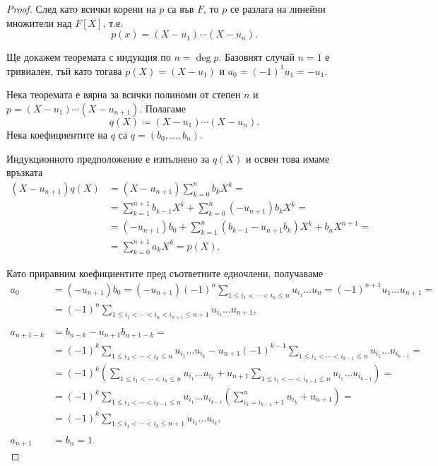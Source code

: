 \documentclass[
  headings=standardclasses,
  bibliography=totocnumbered,
]{scrartcl}
\begin{document}
\begin{proof}
  След като всички корени на \( p \) са във \( F \), то \( p \) се разлага на линейни множители над \( F[X] \), т.е.
  \begin{equation*}
    p(x) = (X - u_1) \cdots (X - u_n).
  \end{equation*}

  Ще докажем теоремата с индукция по \( n = \deg p \). Базовият случай \( n = 1 \) е тривиален, тъй като тогава \( p(X) = (X - u_1) \) и \( a_0 = {(-1)}^1 u_1 = -u_1 \).

  Нека теоремата е вярна за всички полиноми от степен \( n \) и \( p = (X - u_1) \cdots (X - u_{n+1}) \). Полагаме
  \begin{equation*}
    q(X) \coloneqq (X - u_1) \cdots (X - u_n).
  \end{equation*}
  Нека коефициентите на \( q \) са \( q = (b_0, \ldots, b_n) \).

  Индукционното предположение е изпълнено за \( q(X) \) и освен това имаме връзката
  \begin{align*}
    (X - u_{n+1}) q(X)
    &=
    (X - u_{n+1}) \sum_{k=0}^n b_k X^k
    = \\ &=
    \sum_{k=1}^{n+1} b_{k-1} X^k + \sum_{k=0}^n (-u_{n+1}) b_k X^k
    = \\ &=
    (-u_{n+1}) b_0 + \sum_{k=1}^n (b_{k-1} - u_{n+1} b_k) X^k + b_n X^{n+1}
    = \\ &=
    \sum_{k=0}^{n+1} a_k X^k
    =
    p(X).
  \end{align*}

  Като приравним коефициентите пред съответните едночлени, получаваме
  \begin{align*}
    a_0
    &=
    (-u_{n+1}) b_0
    =
    (-u_{n+1}) {(-1)}^n \sum_{1 \leq i_1 < \cdots < i_n \leq n} u_{i_1} \ldots u_n
    =
    {(-1)}^{n+1} u_1 \ldots u_{n+1}
    = \\ &=
    {(-1)}^n \sum_{1 \leq i_1 < \cdots < i_n < i_{n+1} \leq n + 1} u_{i_1} \ldots u_{n+1},
    \\ \\
    a_{n+1-k}
    &=
    b_{n-k} - u_{n+1} b_{n+1-k}
    = \\ &=
    {(-1)}^k \sum_{1 \leq i_1 < \cdots < i_k \leq n} u_{i_1} \ldots u_{i_k} - u_{n+1} {(-1)}^{k-1} \sum_{1 \leq i_1 < \cdots < i_{k-1} \leq n} u_{i_1} \ldots u_{i_{k-1}}
    = \\ &=
    {(-1)}^k \left( \sum_{1 \leq i_1 < \cdots < i_k \leq n} u_{i_1} \ldots u_{i_k} + u_{n+1} \sum_{1 \leq i_1 < \cdots < i_{k-1} \leq n} u_{i_1} \ldots u_{i_{k-1}} \right)
    = \\ &=
    {(-1)}^k \sum_{1 \leq i_1 < \cdots < i_{k-1} \leq n} u_{i_1} \ldots u_{i_{k-1}} \left(\sum_{i_k=i_{k-1}+1}^n u_{i_k} + u_{n+1} \right)
    = \\ &=
    {(-1)}^k \sum_{1 \leq i_1 < \cdots < i_k \leq n + 1} u_{i_1} \ldots u_{i_k},
    \\ \\
    a_{n+1} &= b_n = 1.
  \end{align*}
\end{proof}
\end{document}
